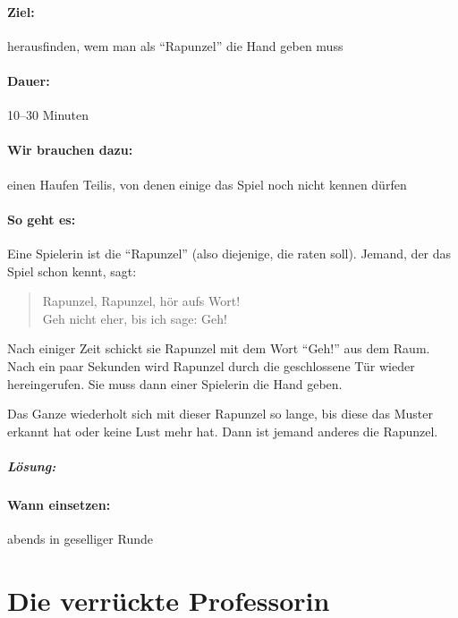 \paragraph{Ziel:} herausfinden, wem man als "`Rapunzel"' die Hand geben muss
\paragraph{Dauer:} 10--30 Minuten
\paragraph{Wir brauchen dazu:} einen Haufen Teilis, von denen einige das Spiel noch nicht kennen dürfen
\paragraph{So geht es:} Eine Spielerin ist die "`Rapunzel"' (also diejenige, die raten soll). Jemand, der das Spiel schon kennt, sagt:
  \begin{quote}
    Rapunzel, Rapunzel, hör aufs Wort!\\
    Geh nicht eher, bis ich sage: Geh!
  \end{quote}
Nach einiger Zeit schickt sie Rapunzel mit dem Wort "`Geh!"' aus dem Raum. Nach ein paar Sekunden wird Rapunzel durch die geschlossene Tür wieder hereingerufen. Sie muss dann einer Spielerin die Hand geben.

Das Ganze wiederholt sich mit dieser Rapunzel so lange, bis diese das Muster erkannt hat oder keine Lust mehr hat. Dann ist jemand anderes die Rapunzel.

\subparagraph{Lösung:}
\vspace{.5em}

\paragraph{Wann einsetzen:} abends in geselliger Runde

\section{Die verrückte Professorin}
